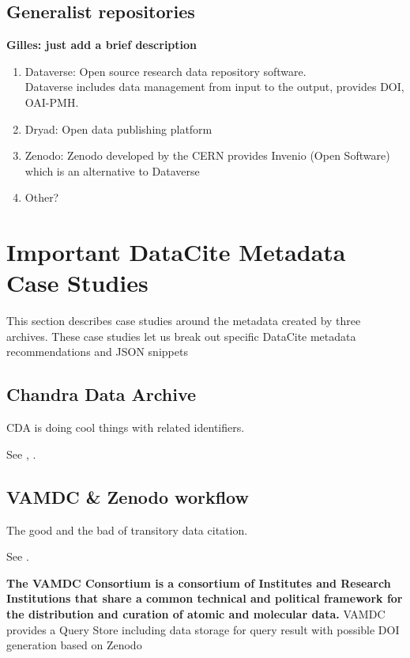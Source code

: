 \documentclass[11pt,a4paper]{ivoa}
\begin{document}
\subsection{Generalist repositories}
\textbf{\color{red}Gilles: just add a brief description}\\

\begin{enumerate}
	\item Dataverse: Open source research data repository software.\\
	Dataverse includes data management from input to the output, provides DOI, OAI-PMH.
	\item Dryad: Open data publishing platform
	\item Zenodo: Zenodo developed by the CERN provides Invenio (Open Software) which is an alternative to Dataverse 
	\item Other? 
\end{enumerate}


\section{Important DataCite Metadata Case Studies}
This section describes case studies around the metadata created by three archives. 
These case studies let us break out specific DataCite metadata recommendations and JSON snippets

\subsection{Chandra Data Archive}
CDA is doing cool things with related identifiers.

See \citep{2023ChNew..34....5D}, \citep{2018EPJWC.18612011R}.

	
\subsection{VAMDC \& Zenodo workflow}
The good and the bad of transitory data citation.

See \citep{2018Galax...6..105M}.

\textbf{\color{red} The VAMDC Consortium is a consortium of Institutes and Research Institutions that share a common technical and political framework for the distribution and curation of atomic and molecular data.}
{\color{red} 
VAMDC provides a Query Store including data storage for query result with possible DOI generation based on Zenodo}\\
\end{document}

